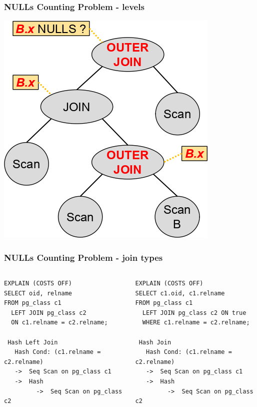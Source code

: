 \documentclass{beamer}
\begin{document}
\begin{frame}[fragile]\frametitle{NULLs Counting Problem - levels}
  \centerline{\includegraphics[scale=0.55]{pics/nulls_levels.png}}
\end{frame}

\begin{frame}[fragile]\frametitle{NULLs Counting Problem - join types}
\begin{columns}\begin{column}{0.5\textwidth}
\begin{lstlisting}
EXPLAIN (COSTS OFF)
SELECT oid, relname
FROM pg_class c1
  LEFT JOIN pg_class c2
  ON c1.relname = c2.relname;

 Hash Left Join
   Hash Cond: (c1.relname = c2.relname)
   ->  Seq Scan on pg_class c1
   ->  Hash
         ->  Seq Scan on pg_class c2
\end{lstlisting}
\end{column}\begin{column}{0.5\textwidth}
\begin{lstlisting}
EXPLAIN (COSTS OFF)
SELECT c1.oid, c1.relname
FROM pg_class c1
  LEFT JOIN pg_class c2 ON true
  WHERE c1.relname = c2.relname;

 Hash Join
   Hash Cond: (c1.relname = c2.relname)
   ->  Seq Scan on pg_class c1
   ->  Hash
         ->  Seq Scan on pg_class c2
\end{lstlisting}
\end{column}\end{columns}
\end{frame}
%
%
\end{document}
